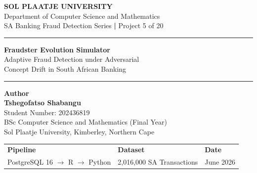 \documentclass[12pt, a4paper]{article}
\begin{document}
\begin{titlepage}
\pagecolor{spunavy}
\color{white}
\centering
\vspace*{1.5cm}

{\fontsize{11}{14}\selectfont\textcolor{spugold}{\textbf{SOL PLAATJE UNIVERSITY}}}\\[0.3cm]
{\fontsize{10}{13}\selectfont Department of Computer Science and Mathematics}\\[0.2cm]
{\fontsize{9}{12}\selectfont SA Banking Fraud Detection Series \textbf{|} Project 5 of 20}

\vspace{1.2cm}
\textcolor{spugold}{\rule{\textwidth}{0.6pt}}
\vspace{0.6cm}

{\fontsize{22}{28}\selectfont\textbf{Fraudster Evolution Simulator}}\\[0.5cm]
{\fontsize{14}{18}\selectfont Adaptive Fraud Detection under Adversarial\\[0.2cm]
Concept Drift in South African Banking}

\vspace{0.6cm}
\textcolor{spugold}{\rule{\textwidth}{0.6pt}}
\vspace{1.5cm}

{\fontsize{12}{16}\selectfont\textbf{Author}}\\[0.4cm]
{\fontsize{14}{18}\selectfont\textbf{Tshegofatso Shabangu}}\\[0.2cm]
{\fontsize{10}{13}\selectfont Student Number: 202436819}\\[0.2cm]
{\fontsize{10}{13}\selectfont BSc Computer Science and Mathematics (Final Year)}\\[0.2cm]
{\fontsize{10}{13}\selectfont Sol Plaatje University, Kimberley, Northern Cape}

\vspace{1.5cm}

\begin{tabular}{C{4cm}C{4cm}C{4cm}}
\textcolor{spugold}{\textbf{Pipeline}} & \textcolor{spugold}{\textbf{Dataset}} & \textcolor{spugold}{\textbf{Date}} \\[0.3cm]
PostgreSQL 16 $\rightarrow$ R $\rightarrow$ Python & 2,016,000 SA Transactions & June 2026 \\
\end{tabular}


\end{titlepage}
\end{document}
